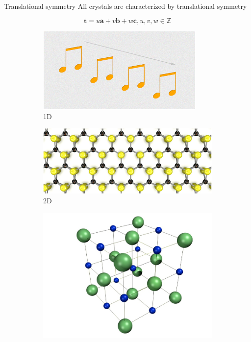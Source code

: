 \documentclass[aspectratio=169]{beamer}
\let \vec \mathbf
\begin{document}
    \begin{frame}{Translational symmetry}
        All crystals are characterized by translational symmetry

        \begin{equation*}
            \vec{t} = u \vec{a} + v \vec{b} + w \vec{c}, u, v, w \in \mathbb{Z}
        \end{equation*}

        \begin{figure}
            \centering
            \begin{subfigure}{0.25\textwidth}
                \includegraphics[width=\linewidth]{lectures/figures/7_1D_crystal.png}
                \caption{1D}
            \end{subfigure}
            \begin{subfigure}{0.4\textwidth}
                \includegraphics[width=\linewidth]{lectures/figures/7_2D_crystal.png}
                \caption{2D}
            \end{subfigure}
            \begin{subfigure}{0.25\textwidth}
                \includegraphics[width=\linewidth]{lectures/figures/7_3D_crystal.png}

\end{subfigure}
\end{figure}
\end{frame}
\end{document}
